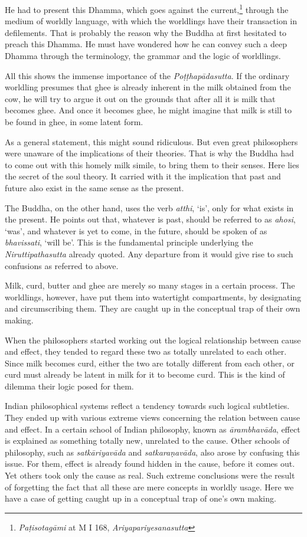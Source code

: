 He had to present this Dhamma, which goes against the current,\footnote{\emph{Paṭisotagāmi} at M I 168, \emph{Ariyapariyesanasutta}} through the medium of worldly language, with which the worldlings have their transaction in defilements. That is probably the reason why the Buddha at first hesitated to preach this Dhamma. He must have wondered how he can convey such a deep Dhamma through the terminology, the grammar and the logic of worldlings.

All this shows the immense importance of the \emph{Poṭṭhapādasutta}. If the ordinary worldling presumes that ghee is already inherent in the milk obtained from the cow, he will try to argue it out on the grounds that after all it is milk that becomes ghee. And once it becomes ghee, he might imagine that milk is still to be found in ghee, in some latent form.

As a general statement, this might sound ridiculous. But even great philosophers were unaware of the implications of their theories. That is why the Buddha had to come out with this homely milk simile, to bring them to their senses. Here lies the secret of the soul theory. It carried with it the implication that past and future also exist in the same sense as the present.

The Buddha, on the other hand, uses the verb \emph{atthi}, `is', only for what exists in the present. He points out that, whatever is past, should be referred to as \emph{ahosi}, `was', and whatever is yet to come, in the future, should be spoken of as \emph{bhavissati}, `will be'. This is the fundamental principle underlying the \emph{Niruttipathasutta} already quoted. Any departure from it would give rise to such confusions as referred to above.

Milk, curd, butter and ghee are merely so many stages in a certain process. The worldlings, however, have put them into watertight compartments, by designating and circumscribing them. They are caught up in the conceptual trap of their own making.

When the philosophers started working out the logical relationship between cause and effect, they tended to regard these two as totally unrelated to each other. Since milk becomes curd, either the two are totally different from each other, or curd must already be latent in milk for it to become curd. This is the kind of dilemma their logic posed for them.

Indian philosophical systems reflect a tendency towards such logical subtleties. They ended up with various extreme views concerning the relation between cause and effect. In a certain school of Indian philosophy, known as \emph{ārambhavāda}, effect is explained as something totally new, unrelated to the cause. Other schools of philosophy, such as \emph{satkāriyavāda} and \emph{satkaraṇavāda}, also arose by confusing this issue. For them, effect is already found hidden in the cause, before it comes out. Yet others took only the cause as real. Such extreme conclusions were the result of forgetting the fact that all these are mere concepts in worldly usage. Here we have a case of getting caught up in a conceptual trap of one's own making.

